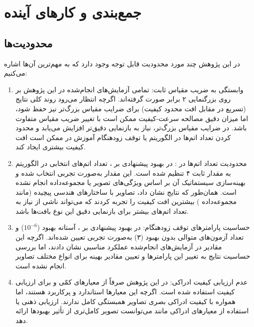 \chapter{جمع‌بندی و کار‌های آینده}
\label{chp:conclusion}
\section{محدودیت‌ها}

در این پژوهش چند مورد محدودیت قابل توجه وجود دارد که به مهم‌ترین آن‌ها اشاره می‌کنیم:
\begin{enumerate}
    \item وابستگی به ضریب مقیاس ثابت: تمامی آزمایش‌های انجام‌شده در این پژوهش بر روی بزرگنمایی ۲ برابر صورت گرفته‌اند. اگرچه انتظار می‌رود روند کلی نتایج (تسریع در مقابل افت محدود کیفیت) برای ضرایب مقیاس بزرگ‌تر نیز حفظ شود، اما میزان دقیق مصالحه سرعت-کیفیت ممکن است با تغییر ضریب مقیاس متفاوت باشد. در ضرایب مقیاس بزرگ‌تر، نیاز به بازنمایی دقیق‌تر افزایش می‌یابد و محدود کردن تعداد اتم‌ها در الگوریتم  یا توقف زودهنگام آموزش در  ممکن است افت کیفیت بیشتری ایجاد کند.

    \item محدودیت تعداد اتم‌ها در : در بهبود پیشنهادی بر ، تعداد اتم‌های انتخابی در الگوریتم  به مقدار ثابت ۴ تنظیم شده است. این مقدار به‌صورت تجربی انتخاب شده و بهینه‌سازی سیستماتیک آن بر اساس ویژگی‌های تصویر یا مجموعه‌داده انجام نشده است. همان‌طور که نتایج نشان داد، تصاویر با ساختارهای هندسی پیچیده (مانند مجموعه‌داده ) بیشترین افت کیفیت را تجربه کردند که می‌تواند ناشی از نیاز به تعداد اتم‌های بیشتر برای بازنمایی دقیق این نوع بافت‌ها باشد.

    \item حساسیت پارامترهای توقف زودهنگام: در بهبود پیشنهادی بر ، آستانه بهبود ($10^{-6}$) و تعداد آزمون‌های متوالی بدون بهبود (۳) به‌صورت تجربی تعیین شده‌اند. اگرچه این مقادیر در آزمایش‌های انجام‌شده عملکرد مناسبی نشان دادند، اما بررسی حساسیت نتایج به تغییر این پارامترها و تعیین مقادیر بهینه برای انواع مختلف تصاویر انجام نشده است.

    \item عدم ارزیابی کیفیت ادراکی: در این پژوهش صرفاً از معیارهای کمّی  و  برای ارزیابی کیفیت استفاده شده است. اگرچه این معیارها استاندارد و پرکاربرد هستند، اما همواره با کیفیت ادراکی بصری تصاویر همبستگی کامل ندارند. ارزیابی ذهنی یا استفاده از معیارهای ادراکی مانند  می‌توانست تصویر کامل‌تری از تأثیر بهبودها ارائه دهد.
\end{enumerate}

